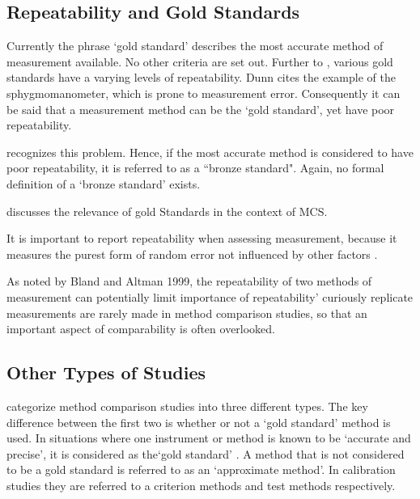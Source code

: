 \documentclass[12pt, a4paper]{report}
\theoremstyle{plain}
\theoremstyle{definition}
\theoremstyle{remark}
\begin{document}
	\subsection{Repeatability and Gold Standards}
	Currently the phrase `gold standard' describes the most accurate method of measurement available. No other criteria are set out. Further to \citet{dunnSEME}, various gold standards have a varying levels of repeatability. Dunn cites the example of the sphygmomanometer, which is prone to measurement error. Consequently it can be said that a measurement method can be the `gold standard', yet have poor repeatability. 
	
	\citet{dunnSEME} recognizes  this problem. Hence, if the most accurate method is considered to have poor repeatability, it is referred to as a ``bronze standard".  Again, no formal definition of a `bronze standard' exists.
	
	
	
	\citet{ARoy2015} discusses the relevance of gold Standards in the context of MCS.
	
	
	
	
	It is important to report repeatability when assessing measurement, because it measures the purest form of random error not influenced by other factors \citep{Barnhart}.	
	
	
	As noted by Bland and Altman 1999, the repeatability of two methods of measurement can  potentially limit	importance of repeatability' curiously replicate measurements are rarely made in method comparison studies, so that an important aspect of comparability is often overlooked.
	
	
	
	
	
	
	
	
	
	\subsection{Other Types of Studies}
	\citet{lewis} categorize method comparison studies into three
	different types.  The key difference between the first two is
	whether or not a `gold standard' method is used. In situations
	where one instrument or method is known to be `accurate and
	precise', it is considered as the`gold standard' \citep{lewis}. A
	method that is not considered to be a gold standard is referred to
	as an `approximate method'. In calibration studies they are
	referred to a criterion methods and test methods respectively.
	
\end{document}

